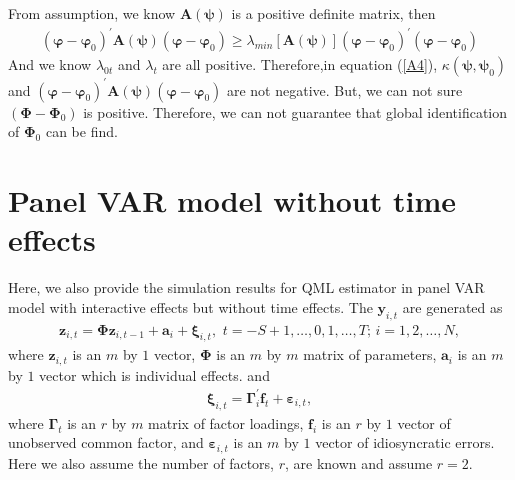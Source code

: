\documentclass[12pt,a4paper,hyperref]{article}
\begin{document}
From assumption, we know $\boldsymbol{A}(\boldsymbol{\psi})$ is a positive definite matrix, then
\begin{align}
 \left( \boldsymbol{\varphi}-\boldsymbol{\varphi}_{0}  \right)^{'}\boldsymbol{A}(\boldsymbol{\psi})\left(  \boldsymbol{\varphi}-\boldsymbol{\varphi}_{0}\right) \geq\lambda_{min}\left[ \boldsymbol{A}(\boldsymbol{\psi})  \right]\left(\boldsymbol{\varphi}-\boldsymbol{\varphi}_{0}   \right)^{'}\left(  \boldsymbol{\varphi}-\boldsymbol{\varphi}_{0}\right)
\end{align}
And we know $\lambda_{0t}$ and $\lambda_{t}$ are all positive. Therefore,in equation (\ref{A4}), $\kappa(\boldsymbol{\psi}, \boldsymbol{\psi}_{0})$ and $\left( \boldsymbol{\varphi}-\boldsymbol{\varphi}_{0}  \right)^{'}\boldsymbol{A}(\boldsymbol{\psi})\left(  \boldsymbol{\varphi}-\boldsymbol{\varphi}_{0}\right)$ are not negative. But, we can not sure $\left(\boldsymbol{\Phi}-\boldsymbol{\Phi}_{0}  \right)$ is positive. Therefore, we can not guarantee that global identification of $\boldsymbol{\Phi}_{0}$ can be find.






\section{Panel VAR model without time effects}
Here, we also provide the simulation results for QML estimator in panel VAR model with interactive effects but without time effects.
The $\boldsymbol{y}_{i,t}$ are generated as
\begin{align}
\boldsymbol{z}_{i,t}=\boldsymbol{\Phi} \boldsymbol{z}_{i,t-1}+\boldsymbol{a}_{i}+ \boldsymbol{\xi}_{i,t},\,\, t=-S+1,\ldots, 0,1,\ldots,T; \, i=1,2,\ldots,N,
\end{align}
where $\boldsymbol{z}_{i,t}$ is an $m$ by $1$ vector, $\boldsymbol{\Phi}$ is an $m$ by $m$ matrix of parameters, $\boldsymbol{a}_{i}$ is an $m$ by $1$ vector which is individual effects.
and
\begin{align}
\boldsymbol{\xi}_{i,t}=\boldsymbol{\Gamma}^{'}_{i}\boldsymbol{f}_{t}+\boldsymbol{\varepsilon}_{i,t},
\end{align}
where  $\boldsymbol{\Gamma}_{t}$ is an $r$ by $m$ matrix of factor loadings, $\boldsymbol{f}_{i}$ is  an $r$ by $1$ vector of unobserved common factor, and $\boldsymbol{\varepsilon}_{i,t}$ is an $m$ by $1$ vector of idiosyncratic errors.
Here we also assume the number of factors, $r$, are known and assume $r=2$.
\end{document}
